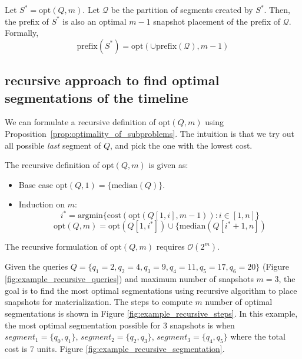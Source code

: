 		\begin{prop}
			Let $S^* = \mathrm{opt}(Q, m)$.  Let $\mathcal{Q}$ be the partition of segments created by $S^*$.  Then, the prefix of $S^*$ is also an optimal $m-1$ snapshot placement of the prefix of $\mathcal{Q}$. Formally, $$\mathrm{prefix}(S^*) = \mathrm{opt}(\cup\mathrm{prefix}(\mathcal{Q}), m-1)$$
		\label{prop:optimality_of_subproblems}
		\end{prop}

		\subsection{recursive approach to find optimal segmentations of the timeline} \label{sec:optimal_recursive_segmentation}
			We can formulate a recursive definition of $\mathrm{opt}(Q, m)$ using Proposition~\ref{prop:optimality_of_subproblems}. The intuition is that we try out all possible {\em last} segment of $Q$, and pick the one with the lowest cost.

			The recursive definition of $\mathrm{opt}(Q, m)$ is given as:

			\begin{itemize}
				\item Base case $ \mathrm{opt}(Q, 1) = \{\mathrm{median}(Q)\}$.
				\item Induction on $m$:
				$$i^* = \mathrm{argmin}\{\mathrm{cost}(\mathrm{opt}(Q[1,i], m-1)): i\in[1,
				n]\}$$
				$$
				\mathrm{opt}(Q, m) = \mathrm{opt}(Q[1, i^*]) \cup \{\mathrm{median}(Q[i^*+1, n])
				$$
			\end{itemize}
			The recursive formulation of $\mathrm{opt}(Q, m)$ requires $\mathcal{O}(2^{m})$.

			\begin{example}
				Given the queries $Q=\{q_1=2,q_2=4,q_3=9,q_4=11,q_5=17,q_6=20\}$ (Figure \ref{fig:example_recursive_queries}) and maximum number of snapshots $m=3$, the goal is to find the most optimal segmentations using recursive algorithm to place snapshots for materialization. The steps to compute $m$ number of optimal segmentations is shown in Figure \ref{fig:example_recursive_steps}. In this example, the most optimal segmentation possible for 3 snapshots is when $segment_1 = \{q_0,q_1\}$, $segment_2 = \{q_2,q_3\}$, $segment_3= \{q_4,q_5\}$ where the total cost is 7 units. Figure \ref{fig:example_recursive_segmentation}.
			\label{example:recursive_segmantation}
			\end{example}

